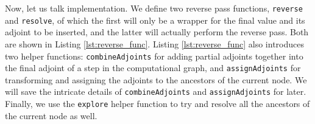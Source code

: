         Now, let us talk implementation.
        We define two reverse pass functions, \texttt{reverse} and \texttt{resolve}, of which the first will only be a wrapper for the final value and its adjoint to be inserted, and the latter will actually perform the reverse pass.
        Both are shown in Listing \ref{lst:reverse_func}.
        Listing \ref{lst:reverse_func} also introduces two helper functions: \texttt{combineAdjoints} for adding partial adjoints together into the final adjoint of a step in the computational graph, and \texttt{assignAdjoints} for transforming and assigning the adjoints to the ancestors of the current node.
        We will save the intricate details of \texttt{combineAdjoints} and \texttt{assignAdjoints} for later.
        Finally, we use the \texttt{explore} helper function to try and resolve all the ancestors of the current node as well.

